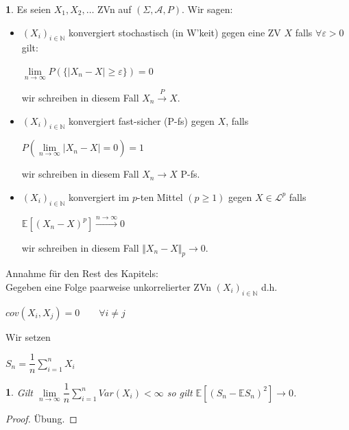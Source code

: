 \documentclass[10pt,a4paper]{report}
\numberwithin{equation}{section}
\numberwithin{figure}{section}
\theoremstyle{plain}
\theoremstyle{definition}
\newtheorem{defn}[thm]{\protect\definitionname}
\theoremstyle{remark}
\theoremstyle{plain}
\newtheorem{prop}[thm]{\protect\propositionname}
\providecommand{\definitionname}{Definition}
\providecommand{\propositionname}{Satz}
\newcommand{\1}{ \mathbb{1} } %
\begin{document}
\begin{defn}   
  Es seien $X_1,X_2,\ldots$ ZVn auf $(\Sigma,\mathcal{A},P)$. Wir
  sagen:
  \begin{itemize}
  \item $(X_i)_{i \in \mathbb{N}}$ konvergiert stochastisch (in
    W'keit) gegen eine ZV $X$ falls $\forall\varepsilon >0$ gilt:
    \begin{center}
      $\lim\limits_{n \to \infty}P(\{|X_n-X|\geq \varepsilon\})=0$
    \end{center}
    wir schreiben in diesem Fall $X_n \overset{P}{\to} X$.
  \item $(X_i)_{i \in \mathbb{N}}$ konvergiert fast-sicher (P-fs)
    gegen $X$, falls
    \begin{center}
      $P\left(\lim\limits_{n \to \infty}|X_n-X|=0\right)=1$
    \end{center}
    wir schreiben in diesem Fall $X_n \to X$ P-fs.
  \item $(X_i)_{i \in \mathbb{N}}$ konvergiert im $p$-ten Mittel
    $(p\geq 1)$ gegen $X \in \mathcal{L}^p$ falls
    \begin{center}
      $\mathbb{E}[(X_n-X)^p] \overset{n \to \infty}{\to}0$
    \end{center}
    wir schreiben in diesem Fall $\Vert X_n-X\Vert_p \to 0$.\\
  \end{itemize}
  Annahme für den Rest des Kapitels:\\
  Gegeben eine Folge paarweise unkorrelierter ZVn $(X_i)_{i \in
    \mathbb{N}}$ d.h.
  \begin{center}
    $cov(X_i,X_j)=0 \qquad \forall i\neq j$
  \end{center}
  Wir setzen
  \begin{center}
    $S_n=\dfrac{1}{n}\sum\limits_{i=1}^nX_i$
  \end{center}
\end{defn}
\begin{prop} 
  Gilt $\lim\limits_{n \to \infty} \dfrac{1}{n}\sum\limits_{i=1}^nVar(X_i)<\infty$ so gilt $\mathbb{E}[(S_n-\mathbb{E}S_n)^2]\to 0$.
\end{prop}
\begin{proof}
  Übung. 
\end{proof}
\end{document}
